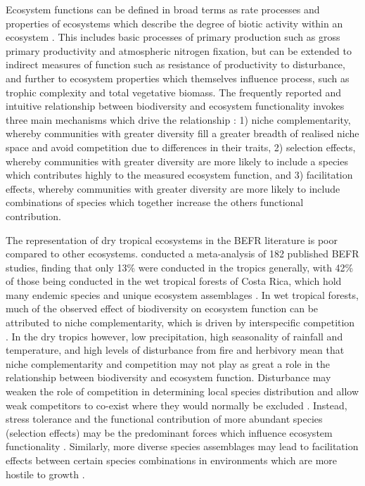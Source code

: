 \documentclass[11pt,a4paper]{article}
\begin{document}
Ecosystem functions can be defined in broad terms as rate processes and properties of ecosystems which describe the degree of biotic activity within an ecosystem \citep{Jax2005}. This includes basic processes of primary production such as gross primary productivity and atmospheric nitrogen fixation, but can be extended to indirect measures of function such as resistance of productivity to disturbance, and further to ecosystem properties which themselves influence process, such as trophic complexity and total vegetative biomass. The frequently reported and intuitive relationship between biodiversity and ecosystem functionality invokes three main mechanisms which drive the relationship \citep{Tilman2014}: 1) niche complementarity, whereby communities with greater diversity fill a greater breadth of realised niche space and avoid competition due to differences in their traits, 2) selection effects, whereby communities with greater diversity are more likely to include a species which contributes highly to the measured ecosystem function, and 3) facilitation effects, whereby communities with greater diversity are more likely to include combinations of species which together increase the others functional contribution.

The representation of dry tropical ecosystems in the BEFR literature is poor compared to other ecosystems. \citet{Clarke2017} conducted a meta-analysis of 182 published BEFR studies, finding that only 13\% were conducted in the tropics generally, with 42\% of those being conducted in the wet tropical forests of Costa Rica, which hold many endemic species and unique ecosystem assemblages \citep{Barthlott2005}. In wet tropical forests, much of the observed effect of biodiversity on ecosystem function can be attributed to niche complementarity, which is driven by interspecific competition \citep{Wright2017, Poorter2015, Sande2017a}. In the dry tropics however, low precipitation, high seasonality of rainfall and temperature, and high levels of disturbance from fire and herbivory mean that niche complementarity and competition may not play as great a role in the relationship between biodiversity and ecosystem function. Disturbance may weaken the role of competition in determining local species distribution and allow weak competitors to co-exist where they would normally be excluded \citep{Grime1979,Grace1990}. Instead, stress tolerance and the functional contribution of more abundant species (selection effects) may be the predominant forces which influence ecosystem functionality \citep{Lasky2014, Tobner2016}. Similarly, more diverse species assemblages may lead to facilitation effects between certain species combinations in environments which are more hostile to growth \citep{Ratcliffe2017}.
\end{document}

